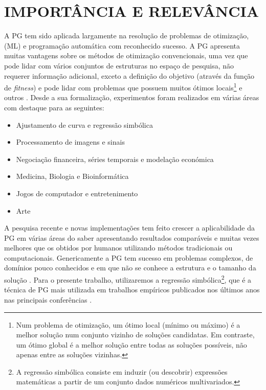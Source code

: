 \section{IMPORTÂNCIA E RELEVÂNCIA}
\label{sec:importancia}

A \ac{PG} tem sido aplicada largamente na resolução de problemas de otimização, (\ac{ML}) e programação automática com 
reconhecido sucesso. A \ac{PG} apresenta muitas vantagens sobre os métodos de otimização convencionais, uma vez que pode lidar
com vários conjuntos de estruturas no espaço de pesquisa, não requerer informação adicional, exceto a definição do objetivo (através 
da função de \emph{fitness}) e pode lidar com problemas que possuem muitos ótimos locais\footnote{Num problema de otimização, um
ótimo local (mínimo ou máximo) é a melhor solução num conjunto vizinho de soluções candidatas. Em contraste, um ótimo global
é a melhor solução entre todas as soluções possíveis, não apenas entre as soluções vizinhas.} e outros \citep{Langdon1996, Banzhaf1998}. 
Desde a sua formalização, experimentos foram realizados em várias áreas com destaque para as seguintes:

\begin{itemize}
\item{Ajustamento de curva e regressão simbólica \citep{Koza1992, Cai2006}}
\item{Processamento de imagens e sinais \citep{Howard20061275}}
\item{Negociação financeira, séries temporais e modelação económica \citep{Chen200575}}
\item{Medicina, Biologia e Bioinformática \citep{Handley1993}}
\item{Jogos de computador e entretenimento \citep{Elyasaf:2011:GES:2001576.2001836}}
\item{Arte \citep{Spector:1994:ccaga}}
\end{itemize}


A pesquisa recente e novas implementações tem feito crescer a aplicabilidade da \ac{PG} em várias 
áreas do saber apresentando resultados comparáveis e muitas vezes melhores que os obtidos por humanos utilizando métodos 
tradicionais ou computacionais. Genericamente a \ac{PG} tem sucesso em problemas complexos, de domínios pouco conhecidos 
e em que não se conhece a estrutura e o tamanho da solução \citep{Poli2008}. Para o presente trabalho, utilizaremos a
regressão simbólica\footnote{A regressão simbólica consiste em induzir (ou descobrir) expressões matemáticas a partir de um conjunto 
dados numéricos multivariados.}, que é a técnica de \ac{PG} mais utilizada em trabalhos empíricos publicados nos últimos anos nas principais
conferências \citep{McDermott:2012:GECCO}.


